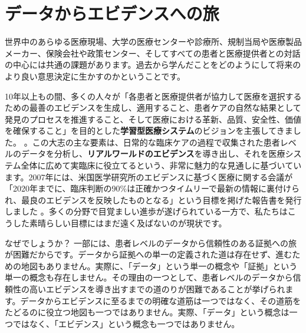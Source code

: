 \documentclass[
  11pt]{book}
\theoremstyle{definition}
\theoremstyle{definition}
\theoremstyle{definition}
\theoremstyle{definition}
\theoremstyle{remark}
\begin{document}
\section{データからエビデンスへの旅}\label{ux30c7ux30fcux30bfux304bux3089ux30a8ux30d3ux30c7ux30f3ux30b9ux3078ux306eux65c5}

世界中のあらゆる医療現場、大学の医療センターや診療所、規制当局や医療製品メーカー、保険会社や政策センター、そしてすべての患者と医療提供者との対話の中心には共通の課題があります。過去から学んだことをどのようにして将来のより良い意思決定に生かすのかということです。

10年以上もの間、多くの人々が「各患者と医療提供者が協力して医療を選択するための最善のエビデンスを生成し、適用すること、患者ケアの自然な結果として発見のプロセスを推進すること、そして医療における革新、品質、安全性、価値を確保すること」を目的とした\textbf{学習型医療システム}のビジョンを主張してきました。 \citep{olsen2007learning}。この大志の主な要素は、日常的な臨床ケアの過程で収集された患者レベルのデータを分析し、\textbf{リアルワールドのエビデンス}を導き出し、それを医療システム全体に広めて実臨床に役立てるという、非常に魅力的な見通しに基づいています。2007年には、米国医学研究所のエビデンスに基づく医療に関する会議が「2020年までに、臨床判断の90\%は正確かつタイムリーで最新の情報に裏付けられ、最良のエビデンスを反映したものとなる」という目標を掲げた報告書を発行しました \citep{olsen2007learning}。多くの分野で目覚ましい進歩が遂げられている一方で、私たちはこうした素晴らしい目標にはまだ遠く及ばないのが現状です。

なぜでしょうか？ 一部には、患者レベルのデータから信頼性のある証拠への旅が困難だからです。データから証拠への単一の定義された道は存在せず、進むための地図もありません。実際に、「データ」という単一の概念や「証拠」という単一の概念も存在しません。その理由の一つとして、患者レベルのデータから信頼性の高いエビデンスを導き出すまでの道のりが困難であることが挙げられます。データからエビデンスに至るまでの明確な道筋は一つではなく、その道筋をたどるのに役立つ地図も一つではありません。実際、「データ」という概念は一つではなく、「エビデンス」という概念も一つではありません。
\end{document}
